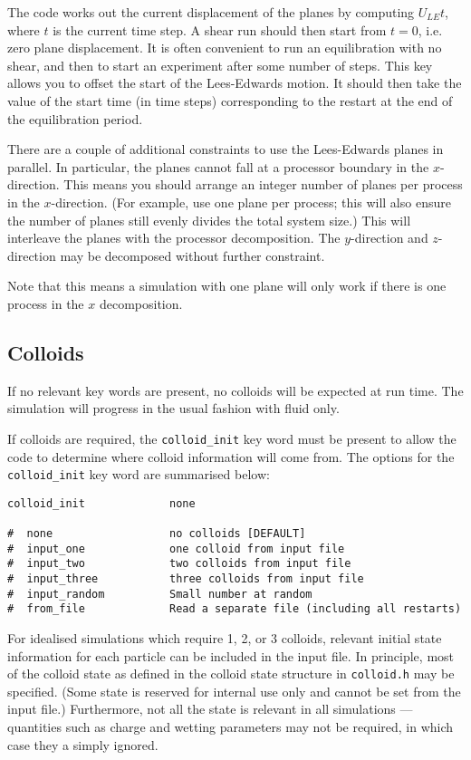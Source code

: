 The code works out the current displacement of the planes by computing
$U_{LE} t$, where $t$ is the current time step. A shear run should then
start from $t = 0$, i.e. zero plane displacement.
It is often convenient to run an equilibration with no shear, and
then to start an experiment after some number of steps. This
key allows you to offset the start of the Lees-Edwards motion.
It should then take the value of the start time (in time steps)
corresponding to the restart at the end of the equilibration
period.

There are a couple of additional constraints to use the Lees-Edwards
planes in parallel. In particular, the planes cannot fall at a
processor boundary in the $x$-direction. This means you should
arrange an integer number of planes per process in the $x$-direction.
(For example, use one plane per process; this will also ensure the number
of planes
still evenly divides the total system size.)
This will interleave the planes with the processor decomposition.
The $y$-direction and $z$-direction may be decomposed without
further constraint.

Note that this means a simulation with one plane will only work
if there is one process in the $x$ decomposition.



\subsection{Colloids}
If no relevant key words are present, no colloids will be
expected at run time. The simulation will progress in the
usual fashion with fluid only.

If colloids are required, the \texttt{colloid\_init}
key word must be present to allow the code to determine where
colloid information will come from. The options for the
\texttt{colloid\_init} key word are summarised below:
\begin{lstlisting}
colloid_init             none

#  none                  no colloids [DEFAULT]
#  input_one             one colloid from input file
#  input_two             two colloids from input file
#  input_three           three colloids from input file
#  input_random          Small number at random
#  from_file             Read a separate file (including all restarts)
\end{lstlisting}

For idealised simulations which require 1, 2, or 3 colloids, relevant
initial state information 
for each particle can be included in the input file. In principle, most
of the colloid state as defined in the colloid
state structure in \texttt{colloid.h} may be specified. (Some state is
reserved for internal use only and cannot be set from the input file.)
Furthermore, not all the state is relevant in all simulations ---
quantities such as charge and wetting parameters may not be required,
in which case they a simply ignored.


